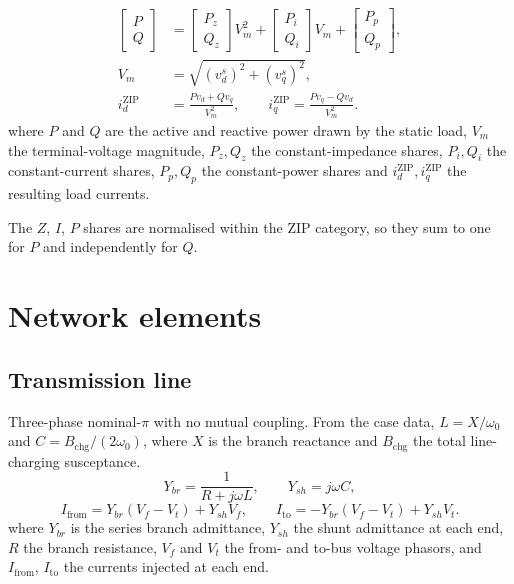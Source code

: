 \documentclass[11pt]{article}
\newcommand{\wnom}{\omega_0}
\begin{document}
\begin{align}
  \begin{bmatrix}P\\Q\end{bmatrix}
    &= \begin{bmatrix}P_z\\Q_z\end{bmatrix}V_m^2
     + \begin{bmatrix}P_i\\Q_i\end{bmatrix}V_m
     + \begin{bmatrix}P_p\\Q_p\end{bmatrix}, \\
  V_m &= \sqrt{(v_d^s)^2 + (v_q^s)^2}, \\
  i_d^{\text{ZIP}} &= \frac{P v_d + Q v_q}{V_m^2}, \qquad
  i_q^{\text{ZIP}} = \frac{P v_q - Q v_d}{V_m^2}.
\end{align}
where $P$ and $Q$ are the active and reactive power drawn by the static
load, $V_m$ the terminal-voltage magnitude, $P_z,Q_z$ the
constant-impedance shares, $P_i,Q_i$ the constant-current shares,
$P_p,Q_p$ the constant-power shares and $i_d^{\text{ZIP}},i_q^{\text{ZIP}}$
the resulting load currents.

The $Z$, $I$, $P$ shares are normalised within the ZIP category, so they
sum to one for $P$ and independently for $Q$.

\section{Network elements}

\subsection{Transmission line}

Three-phase nominal-$\pi$ with no mutual coupling. From the case data,
$L = X/\wnom$ and $C = B_{\text{chg}}/(2\wnom)$, where $X$ is the branch
reactance and $B_{\text{chg}}$ the total line-charging susceptance.
\begin{equation}
  Y_{br} = \frac{1}{R + j\omega L},\qquad Y_{sh} = j\omega C,
\end{equation}
\begin{equation}
  I_{\text{from}} = Y_{br}(V_f - V_t) + Y_{sh}V_f,\qquad
  I_{\text{to}}   = -Y_{br}(V_f - V_t) + Y_{sh}V_t .
\end{equation}
where $Y_{br}$ is the series branch admittance, $Y_{sh}$ the shunt
admittance at each end, $R$ the branch resistance, $V_f$ and $V_t$ the
from- and to-bus voltage phasors, and $I_{\text{from}}$, $I_{\text{to}}$
the currents injected at each end.
\end{document}
